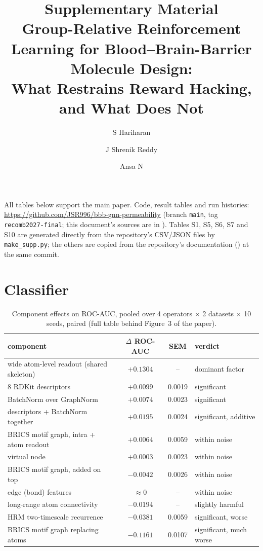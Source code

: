 \documentclass[10pt,letterpaper]{article}
\title{Supplementary Material\\[2pt]\large Group-Relative Reinforcement Learning for Blood--Brain-Barrier Molecule Design:\\ What Restrains Reward Hacking, and What Does Not}
\author{S Hariharan \and J Shrenik Reddy \and Ansa N}
\date{}
\newcommand{\REPO}{\url{https://github.com/JSR996/bbb-gnn-permeability}}
\begin{document}
\sloppy
\maketitle
\noindent All tables below support the main paper. Code, result tables and run histories: \REPO{} (branch \texttt{main}, tag \texttt{recomb2027-final}; this document's sources are in ). Tables S1, S5, S6, S7 and S10 are generated directly from the repository's CSV/JSON files by \texttt{make\_supp.py}; the others are copied from the repository's documentation () at the same commit.

\section{Classifier}
\begin{table}[!htbp]\centering\small
\caption{Test ROC-AUC per model (mean $\pm$ sd over 10 seeds; each seed a different scaffold split). Wang ($n=55$) and Adenot ($n=59$) are scaffold-disjoint external holdouts scored by models trained on the indicated corpus. LightGBM uses the same 8 descriptors as the hybrid models.}
\label{tab:s1}
\end{table}

\begin{table}[!htbp]\centering
\caption{Component effects on ROC-AUC, pooled over 4 operators $\times$ 2 datasets $\times$ 10 seeds, paired (full table behind Figure~3 of the paper).}
\label{tab:s2}
\begin{tabular}{@{}lccl@{}}\toprule
component & $\Delta$ ROC-AUC & SEM & verdict\\\midrule
wide atom-level readout (shared skeleton) & $+0.1304$ & -- & dominant factor\\
8 RDKit descriptors & $+0.0099$ & 0.0019 & significant\\
BatchNorm over GraphNorm & $+0.0074$ & 0.0023 & significant\\
descriptors + BatchNorm together & $+0.0195$ & 0.0024 & significant, additive\\
BRICS motif graph, intra + atom readout & $+0.0064$ & 0.0059 & within noise\\
virtual node & $+0.0003$ & 0.0023 & within noise\\
BRICS motif graph, added on top & $-0.0042$ & 0.0026 & within noise\\
edge (bond) features & $\approx0$ & -- & within noise\\
long-range atom connectivity & $-0.0194$ & -- & slightly harmful\\
HRM two-timescale recurrence & $-0.0381$ & 0.0059 & significant, worse\\
BRICS motif graph replacing atoms & $-0.1161$ & 0.0107 & significant, much worse\\\bottomrule
\end{tabular}
\end{table}
\end{document}
